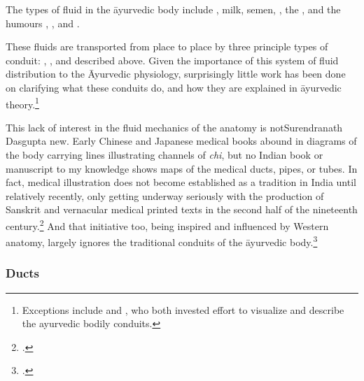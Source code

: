 The types of fluid in the āyurvedic body include ,
milk, semen, , the , and the humours , , and
.



These fluids are transported from place to place by three principle
types of conduit: , , and
 described above. Given the importance of this
system of fluid distribution to the Āyurvedic physiology, surprisingly
little work has been done on clarifying what these conduits do, and
how they are explained in āyurvedic theory.\footnote{Exceptions
    include \citet[ii.13]{dasg-hist} and \citet[ch.\,2]{kutu-1962}, who
    both invested effort to visualize and describe the ayurvedic bodily
    conduits.}

This lack of interest in the fluid mechanics of the anatomy is notSurendranath 
Dasgupta
new.  Early Chinese and Japanese medical books abound in diagrams of
the body carrying lines illustrating channels of \emph{chi}, but no
Indian book or manuscript to my knowledge shows maps of the medical
ducts, pipes, or tubes.  In fact, medical illustration does not become
established as a tradition in India until relatively recently, only
getting underway seriously with the production of Sanskrit and
vernacular medical printed texts in the second half of the nineteenth
century.\footcite{wuja-2008a}  And that initiative too, being inspired
and influenced by Western anatomy, largely ignores the traditional
conduits of the āyurvedic body.\footnote{\cite{birc-2024,lust-2018}.}

\subsubsection{Ducts}

